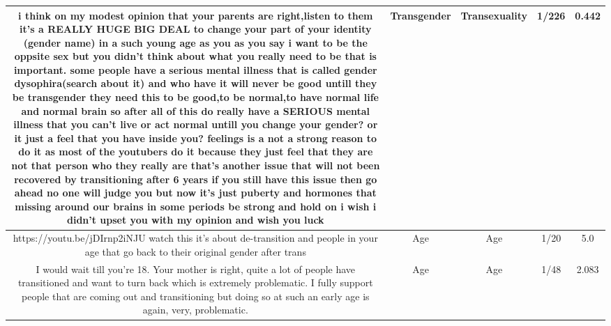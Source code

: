 \documentclass[11pt]{article}
\newlength\mylength
\begin{document}
\begin{center}
\begin{longtable}{|C{.40\mylength}|C{.30\mylength}|C{.15\mylength}|C{.15\mylength}|C{.15\mylength}|}
  i think  on my modest opinion  that your parents are right,listen to them it's a REALLY HUGE BIG DEAL to change your part of your identity (gender   name) in a such young age as you as you say    i want to be  the oppsite sex but you didn't think about what you really  need to be  that is important.  some people have a serious mental illness that is called gender dysophira(search about it) and who have it will never be good untill they be transgender they  need  this to be good,to be normal,to have normal life and normal brain so after all of this do really have a SERIOUS mental illness that you can't live or act normal untill you change your gender? or it just a feel that you have inside you? feelings is a not a strong reason to do it as most of the youtubers do it because they just feel that they are not that person who they really are that's another issue that will not been recovered by transitioning after 6 years if you still have this issue then go ahead no one will judge you but now it's just puberty and hormones that missing around our brains in some periods be strong and hold on i wish i didn't upset you with my opinion and wish you luck  & Transgender & Transexuality & 1/226 & 0.442 \\  \hline
  https://youtu.be/jDIrnp2iNJU watch this it's about de-transition and people in your age that go back to their original gender after trans  & Age & Age & 1/20 & 5.0 \\  \hline
  I would wait till you're 18. Your mother is right, quite a lot of people have transitioned and want to turn back which is extremely problematic. I fully support people that are coming out and transitioning but doing so at such an early age is again, very, problematic.  & Age & Age & 1/48 & 2.083 \\  \hline

\end{longtable}
\end{center}
\end{document}
